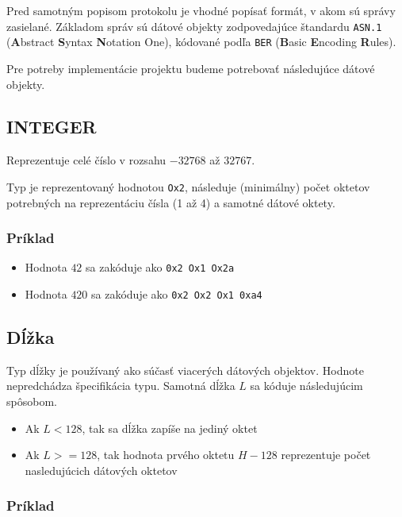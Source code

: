 \documentclass[12pt]{report}
\begin{document}
Pred samotným popisom protokolu je vhodné popísať formát, v akom sú správy zasielané.
Základom správ sú dátové objekty zodpovedajúce štandardu \texttt{ASN.1}\cite{ASN} (\textbf{A}bstract
\textbf{S}yntax \textbf{N}otation One), kódované podľa \texttt{BER}\cite{BER} (\textbf{B}asic
\textbf{E}ncoding \textbf{R}ules).

Pre potreby implementácie projektu budeme potrebovať následujúce dátové objekty.

\subsection{INTEGER}

Reprezentuje celé číslo v rozsahu $-32768$ až $32767$.

Typ je reprezentovaný hodnotou \texttt{Ox2}, následuje (minimálny) počet oktetov potrebných na
reprezentáciu čísla (1 až 4) a samotné dátové oktety.

\subsubsection*{Príklad}

\begin{itemize}
    \item Hodnota $42$ sa zakóduje ako \texttt{0x2 Ox1 Ox2a}
    \item Hodnota $420$ sa zakóduje ako \texttt{0x2 Ox2 Ox1 0xa4}
\end{itemize}


\subsection{Dĺžka}

Typ dĺžky je používaný ako súčasť viacerých dátových objektov.
Hodnote nepredchádza špecifikácia typu. Samotná dĺžka $L$ sa kóduje následujúcim spôsobom.

\begin{itemize}
    \item Ak $L < 128$, tak sa dĺžka zapíše na jediný oktet
    \item Ak $L >= 128$, tak hodnota prvého oktetu $H - 128$ reprezentuje počet nasledujúcich dátových oktetov
\end{itemize}

\subsubsection*{Príklad}
\end{document}
